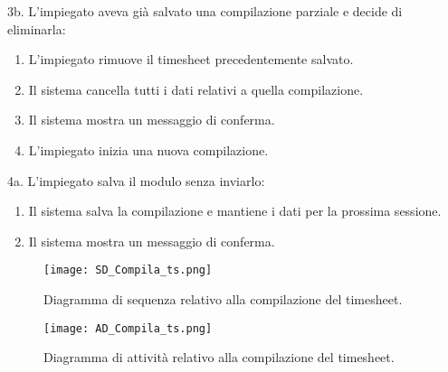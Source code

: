 3b. L'impiegato aveva già salvato una compilazione parziale e decide di eliminarla:
\begin{enumerate}
    \item L'impiegato rimuove il timesheet precedentemente salvato.
    \item Il sistema cancella tutti i dati relativi a quella compilazione.
    \item Il sistema mostra un messaggio di conferma.
    \item L'impiegato inizia una nuova compilazione.
\end{enumerate}
4a. L'impiegato salva il modulo senza inviarlo:
\begin{enumerate}
    \item Il sistema salva la compilazione e mantiene i dati per la prossima sessione.
    \item Il sistema mostra un messaggio di conferma.
\end{enumerate}

\begin{figure}[H]
	\centering
	\texttt{[image: SD\_Compila\_ts.png]}
	\caption{Diagramma di sequenza relativo alla compilazione del timesheet.}
	\label{fig:sd_compilats}
\end{figure}

\begin{figure}[H]
	\centering
	\texttt{[image: AD\_Compila\_ts.png]}
	\caption{Diagramma di attività relativo alla compilazione del timesheet.}
	\label{fig:ad_compilats}
\end{figure}

